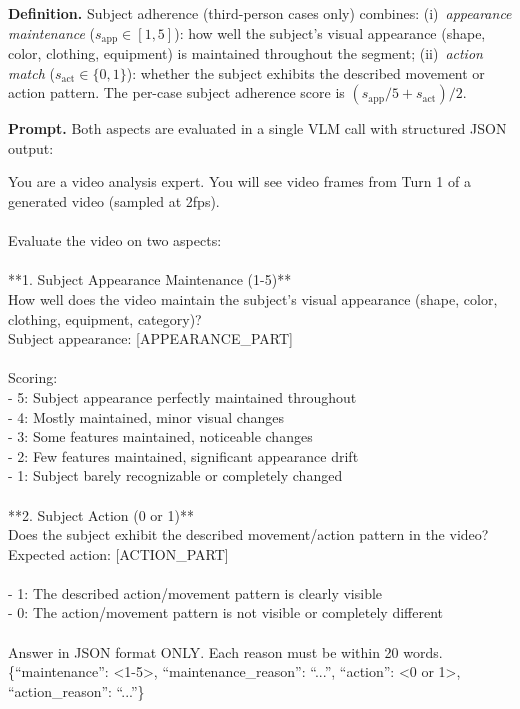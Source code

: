\documentclass{llmxive}
\providecommand{\myparagraph}[1]{\vspace{-0.1em}\noindent\textbf{#1}\hspace{0.3em}}
\begin{document}
\myparagraph{Definition.}
Subject adherence (third-person cases only) combines:
(i)~\emph{appearance maintenance} ($s_{\mathrm{app}} \in [1,5]$): how well the subject's visual appearance (shape, color, clothing, equipment) is maintained throughout the segment;
(ii)~\emph{action match} ($s_{\mathrm{act}} \in \{0,1\}$): whether the subject exhibits the described movement or action pattern.
The per-case subject adherence score is $(s_{\mathrm{app}}/5 + s_{\mathrm{act}}) / 2$.

\myparagraph{Prompt.}
Both aspects are evaluated in a single VLM call with structured JSON output:

\begin{tcolorbox}[d2box, title={Subject Adherence Prompt}]
\ttfamily\scriptsize
You are a video analysis expert. You will see video frames from Turn 1 of a generated video (sampled at 2fps).\\
\\
Evaluate the video on two aspects:\\
\\
**1. Subject Appearance Maintenance (1-5)**\\
How well does the video maintain the subject's visual appearance (shape, color, clothing, equipment, category)?\\
Subject appearance: [APPEARANCE\_PART]\\
\\
Scoring:\\
- 5: Subject appearance perfectly maintained throughout\\
- 4: Mostly maintained, minor visual changes\\
- 3: Some features maintained, noticeable changes\\
- 2: Few features maintained, significant appearance drift\\
- 1: Subject barely recognizable or completely changed\\
\\
**2. Subject Action (0 or 1)**\\
Does the subject exhibit the described movement/action pattern in the video?\\
Expected action: [ACTION\_PART]\\
\\
- 1: The described action/movement pattern is clearly visible\\
- 0: The action/movement pattern is not visible or completely different\\
\\
Answer in JSON format ONLY. Each reason must be within 20 words.\\
\{``maintenance'': <1-5>, ``maintenance\_reason'': ``...'', ``action'': <0 or 1>, ``action\_reason'': ``...''\}
\end{tcolorbox}
\end{document}
